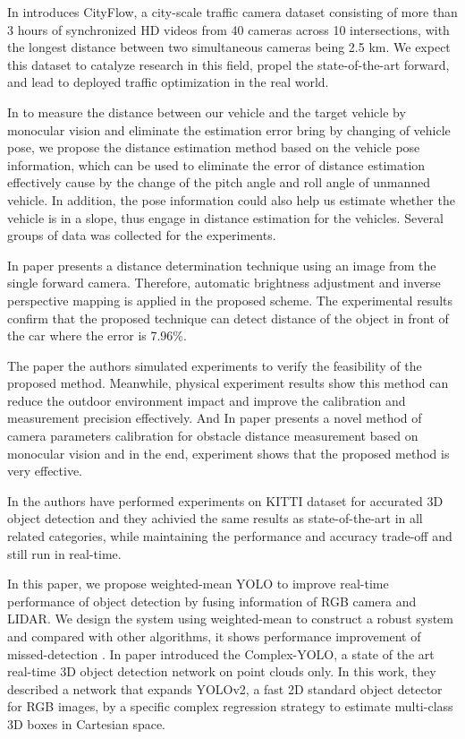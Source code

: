 In \cite{Tang2019} introduces CityFlow, a city-scale traffic camera dataset consisting of more than 3 hours of synchronized HD videos from 40 cameras across 10 intersections, with the longest distance between two simultaneous cameras being 2.5 km. We expect this dataset to catalyze research in this field, propel the state-of-the-art forward, and lead to deployed traffic optimization in the real world.

In \cite{Qi2019} to measure the distance between our vehicle and the target vehicle by monocular vision and eliminate the estimation error bring by changing of vehicle pose, we propose the distance estimation method based on the vehicle pose information, which can be used to eliminate the error of distance estimation effectively cause by the change of the pitch angle and roll angle of unmanned vehicle. In addition, the pose information could also help us estimate whether the vehicle is in a slope, thus engage in distance estimation for the vehicles. Several groups of data was collected for the experiments.

In paper \cite{Wongsaree2018} presents a distance determination technique using an image from the single forward camera. Therefore, automatic brightness adjustment and inverse perspective mapping is applied in the proposed scheme. The experimental results confirm that the proposed technique can detect distance of the object in front of the car where the error is 7.96\%.

The paper \cite{Pan2019} the authors simulated experiments to verify the feasibility of the proposed method. Meanwhile, physical experiment results show this method can reduce the outdoor environment impact and improve the calibration and measurement precision effectively. And In paper \cite{Lin2014} presents a novel method of camera parameters calibration for obstacle distance measurement based on monocular vision and in the end, experiment shows that the proposed method is very effective.

In \cite{Simon2019a} the authors have performed  experiments on KITTI dataset for accurated 3D object detection and they achivied the same results as state-of-the-art in all related categories, while maintaining the performance and accuracy trade-off and still run in real-time.


In this paper, we propose weighted-mean YOLO to improve real-time performance of object detection by fusing information of RGB camera and LIDAR. We design the system using weighted-mean to construct a robust system and compared with other algorithms, it shows performance improvement of missed-detection \cite{Kim2019}. In paper \cite{Simon2019} introduced the Complex-YOLO, a state of the art real-time 3D object detection network on point clouds only. In this work, they described a network that expands YOLOv2, a fast 2D standard object detector for RGB images, by a specific complex regression strategy to estimate multi-class 3D boxes in Cartesian space. 



